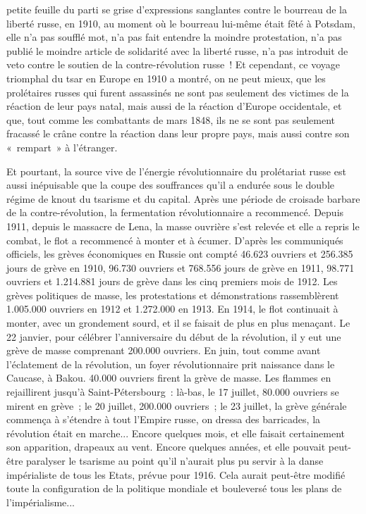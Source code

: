 \documentclass[french,twoside]{book} %
\begin{document}
petite feuille du parti se grise d’expressions sanglantes contre le bourreau de la liberté russe, en 1910, au moment où le bourreau lui-même était fêté à Potsdam, elle n’a pas soufflé mot, n’a pas fait entendre la moindre protestation, n’a pas publié le moindre article de solidarité avec la liberté russe, n’a pas introduit de veto contre le soutien de la contre-révolution russe ! Et cependant, ce voyage triomphal du tsar en Europe en 1910 a montré, on ne peut mieux, que les prolétaires russes qui furent assassinés ne sont pas seulement des victimes de la réaction de leur pays natal, mais aussi de la réaction d’Europe occidentale, et que, tout comme les combattants de mars 1848, ils ne se sont pas seulement fracassé le crâne contre la réaction dans leur propre pays, mais aussi contre son « rempart » à l’étranger.\par
Et pourtant, la source vive de l’énergie révolutionnaire du prolétariat russe est aussi inépuisable que la coupe des souffrances qu’il a endurée sous le double régime de knout du tsarisme et du capital. Après une période de croisade barbare de la contre-révolution, la fermentation révolutionnaire a recommencé. Depuis 1911, depuis le massacre de Lena, la masse ouvrière s’est relevée et elle a repris le combat, le flot a recommencé à monter et à écumer. D'après les communiqués officiels, les grèves économiques en Russie ont compté 46.623 ouvriers et 256.385 jours de grève en 1910, 96.730 ouvriers et 768.556 jours de grève en 1911, 98.771 ouvriers et 1.214.881 jours de grève dans les cinq premiers mois de 1912. Les grèves politiques de masse, les protestations et démonstrations rassemblèrent 1.005.000 ouvriers en 1912 et 1.272.000 en 1913. En 1914, le flot continuait à monter, avec un grondement sourd, et il se faisait de plus en plus menaçant. Le 22 janvier, pour célébrer l’anniversaire du début de la révolution, il y eut une grève de masse comprenant 200.000 ouvriers. En juin, tout comme avant l’éclatement de la révolution, un foyer révolutionnaire prit naissance dans le Caucase, à Bakou. 40.000 ouvriers firent la grève de masse. Les flammes en rejaillirent jusqu’à Saint-Pétersbourg : là-bas, le 17 juillet, 80.000 ouvriers se mirent en grève ; le 20 juillet, 200.000 ouvriers ; le 23 juillet, la grève générale commença à s’étendre à tout l’Empire russe, on dressa des barricades, la révolution était en marche... Encore quelques mois, et elle faisait certainement son apparition, drapeaux au vent. Encore quelques années, et elle pouvait peut-être paralyser le tsarisme au point qu’il n’aurait plus pu servir à la danse impérialiste de tous les Etats, prévue pour 1916. Cela aurait peut-être modifié toute la configuration de la politique mondiale et bouleversé tous les plans de l’impérialisme...\par
\end{document}
